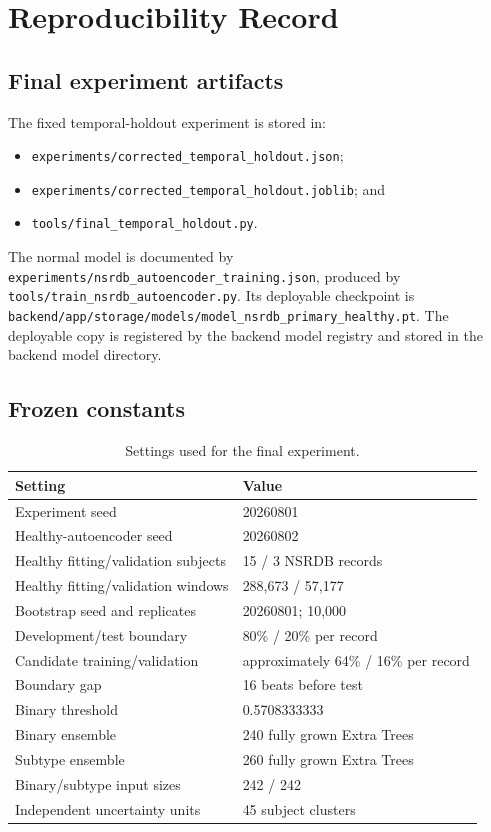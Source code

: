 \chapter{Reproducibility Record}

\section{Final experiment artifacts}

The fixed temporal-holdout experiment is stored in:
\begin{itemize}
    \item \nolinkurl{experiments/corrected_temporal_holdout.json};
    \item \nolinkurl{experiments/corrected_temporal_holdout.joblib}; and
    \item \nolinkurl{tools/final_temporal_holdout.py}.
\end{itemize}
The normal model is documented by
\nolinkurl{experiments/nsrdb_autoencoder_training.json}, produced by
\nolinkurl{tools/train_nsrdb_autoencoder.py}. Its deployable checkpoint is
\nolinkurl{backend/app/storage/models/model_nsrdb_primary_healthy.pt}.
The deployable copy is registered by the backend model registry and stored in
the backend model directory.

\section{Frozen constants}

\begin{table}[htbp]
\centering
\caption{Settings used for the final experiment.}
\begin{tabular}{ll}
\toprule
Setting & Value\\
\midrule
Experiment seed & 20260801\\
Healthy-autoencoder seed & 20260802\\
Healthy fitting/validation subjects & 15 / 3 NSRDB records\\
Healthy fitting/validation windows & 288,673 / 57,177\\
Bootstrap seed and replicates & 20260801; 10,000\\
Development/test boundary & 80\% / 20\% per record\\
Candidate training/validation & approximately 64\% / 16\% per record\\
Boundary gap & 16 beats before test\\
Binary threshold & 0.5708333333\\
Binary ensemble & 240 fully grown Extra Trees\\
Subtype ensemble & 260 fully grown Extra Trees\\
Binary/subtype input sizes & 242 / 242\\
Independent uncertainty units & 45 subject clusters\\
\bottomrule
\end{tabular}
\end{table}

